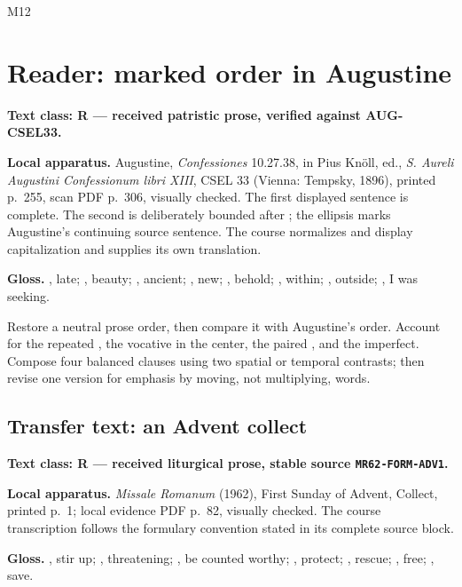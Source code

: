 \begin{courseunit}{M12}
\chapter{Reader: marked order in Augustine}

\textbf{Text class: R --- received patristic prose, verified against
AUG-CSEL33.}

\ReaderAugustineLate

\textbf{Local apparatus.} Augustine, \textit{Confessiones} 10.27.38, in Pius
Knöll, ed., \textit{S. Aureli Augustini Confessionum libri XIII}, CSEL 33
(Vienna: Tempsky, 1896), printed p.~255, scan PDF p.~306, visually checked.
The first displayed sentence is complete.  The second is deliberately bounded
after ; the ellipsis marks Augustine's continuing source
sentence.  The course normalizes  and display capitalization and
supplies its own translation.

\textbf{Gloss.} , late; , beauty;
, ancient; , new; , behold;
, within; , outside; , I was seeking.

Restore a neutral prose order, then compare it with Augustine's order.  Account
for the repeated , the vocative in the center, the paired
, and the imperfect.  Compose four balanced clauses using
two spatial or temporal contrasts; then revise one version for emphasis by
moving, not multiplying, words.

\section{Transfer text: an Advent collect}

\textbf{Text class: R --- received liturgical prose, stable source
\texttt{MR62-FORM-ADV1}.}

\ReaderAdventCollect

\textbf{Local apparatus.} \textit{Missale Romanum} (1962), First Sunday of
Advent, Collect, printed p.~1; local evidence PDF p.~82, visually checked.
The course transcription follows the formulary convention stated in its
complete source block.

\textbf{Gloss.} , stir up; , threatening;
, be counted worthy; , protect;
, rescue; , free; , save.


\end{courseunit}
